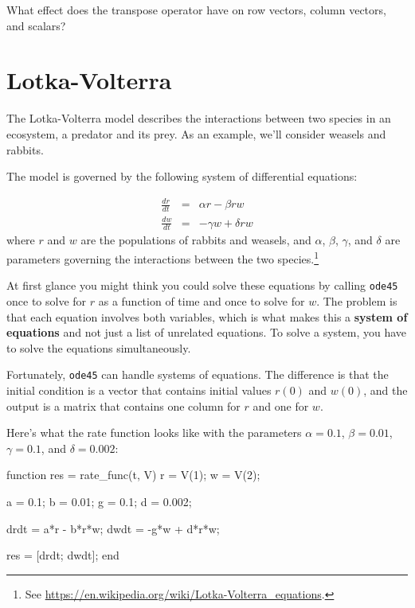 \documentclass[
]{book}
\numberwithin{Answer}{chapter}
\numberwithin{Exercise}{chapter}
\begin{document}
\begin{ex}
What effect does the transpose operator
have on row vectors, column vectors, and scalars?
\end{ex}


\section{Lotka-Volterra}
\label{sect:lotka}

The Lotka-Volterra model describes the interactions between two
species in an ecosystem, a predator and its prey.  As an example, we'll consider weasels and rabbits.

The model is governed by the following system of differential equations:

\begin{eqnarray}
    \frac{dr}{dt} &=& \alpha r - \beta r w
    \\[6pt]
    \frac{dw}{dt} &=& - \gamma w + \delta r w
\end{eqnarray}
%
where $r$ and $w$ are the populations of rabbits and weasels,
and $\alpha$, $\beta$, $\gamma$, and $\delta$ are parameters
governing the interactions between the two species.\footnote{See
\url{https://en.wikipedia.org/wiki/Lotka-Volterra_equations}.}

At first glance you might think you could solve these equations by
calling {\tt ode45} once to solve for $r$ as a function of time and
once to solve for $w$.  The problem is that each equation involves
both variables, which is what makes this a {\bf system of equations}
and not just a list of unrelated equations.  To solve a system, you
have to solve the equations simultaneously.


Fortunately, {\tt ode45} can handle systems of equations.  The
difference is that the initial condition is a vector that contains
initial values $r(0)$ and $w(0)$, and the output is a matrix
that contains one column for $r$ and one for $w$.

Here's what the rate function looks like
with the parameters $\alpha = 0.1$, $\beta = 0.01$, $\gamma = 0.1$, 
and $\delta = 0.002$:

\begin{code}
function res = rate_func(t, V)
    r = V(1);
    w = V(2);

    a = 0.1;   %
    b = 0.01;  %
    g = 0.1;   %
    d = 0.002; %

    drdt = a*r - b*r*w;
    dwdt = -g*w + d*r*w;

    res = [drdt; dwdt];
end
\end{code}
\end{document}
